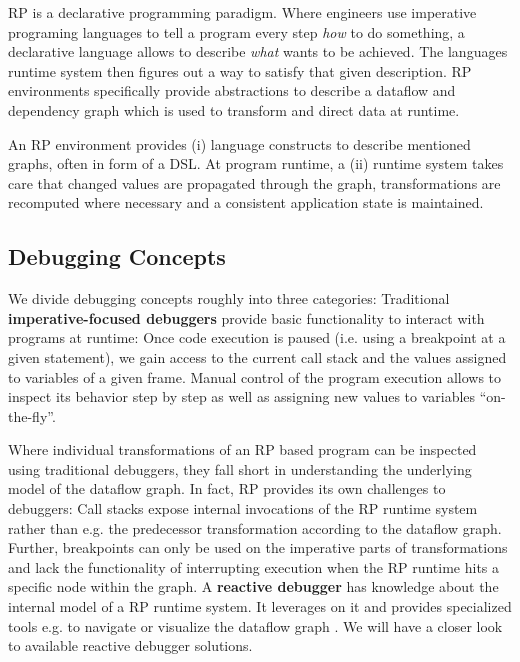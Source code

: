 \documentclass[12pt,a4paper]{article}
\begin{document}
RP is a declarative programming paradigm. Where engineers use imperative programing languages to tell a program every step \emph{how} to do something, a declarative language allows to describe \emph{what} wants to be achieved. The languages runtime system then figures out a way to satisfy that given description. RP environments specifically provide abstractions to describe a dataflow and dependency graph which is used to transform and direct data at runtime.

An RP environment provides (i) language constructs to describe mentioned graphs, often in form of a DSL\cite{10.1145/2577080.2577083}. At program runtime, a (ii) runtime system takes care that changed values are propagated through the graph, transformations are recomputed where necessary and a consistent application state is maintained.

\subsection{Debugging Concepts}

We divide debugging concepts roughly into three categories: Traditional \textbf{imperative-focused debuggers} provide basic functionality to interact with programs at runtime: Once code execution is paused (i.e. using a breakpoint at a given statement), we gain access to the current call stack and the values assigned to variables of a given frame. Manual control of the program execution allows to inspect its behavior step by step as well as assigning new values to variables ``on-the-fly''.

Where individual transformations of an RP based program can be inspected using traditional debuggers, they fall short in understanding the underlying model of the dataflow graph. In fact, RP provides its own challenges to debuggers: Call stacks expose internal invocations of the RP runtime system rather than e.g. the predecessor transformation according to the dataflow graph. Further, breakpoints can only be used on the imperative parts of transformations and lack the functionality of interrupting execution when the RP runtime hits a specific node within the graph. A \textbf{reactive debugger} has knowledge about the internal model of a RP runtime system. It leverages on it and provides specialized tools e.g. to navigate or visualize the dataflow graph \cite{10.1145/2884781.2884815} \cite{10.1145/3180155.3180156} \cite{rxviz}. We will have a closer look to available reactive debugger solutions.
\end{document}
